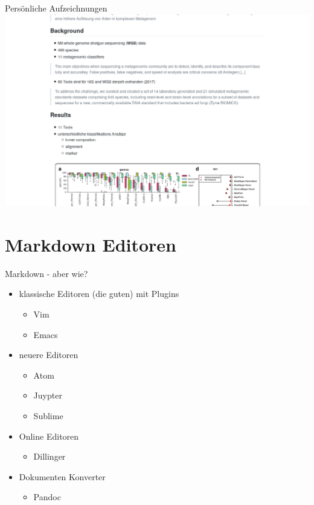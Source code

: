\documentclass{beamer}
\begin{document}
\begin{frame}{Persönliche Aufzeichnungen}
        \includegraphics[scale=0.25]{aufzeichnungen.png}
\end{frame}

\section{Markdown Editoren}
\begin{frame}{Markdown - aber wie?}
\begin{itemize}
    \item klassische Editoren (die guten) mit Plugins
    \begin{itemize}
        \item Vim
        \item Emacs
    \end{itemize}
    \item neuere Editoren    
    \begin{itemize}
        \item Atom
        \item Juypter
        \item Sublime
    \end{itemize}
    \item Online Editoren
    \begin{itemize}
        \item Dillinger
    \end{itemize}
    \item Dokumenten Konverter
        \begin{itemize}
            \item Pandoc
        \end{itemize}
    \end{itemize}
\end{frame}
\end{document}

